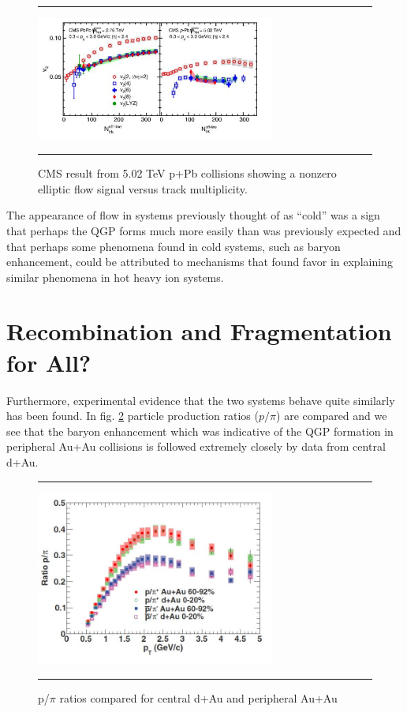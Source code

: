 \begin{figure}[htbp!]
  \centering    \rule{35em}{0.5pt}
    \includegraphics[width=0.7\textwidth]{prevplots/pPbflowLHC.JPG}

  \caption[Elliptic Flow in p+Pb at the LHC]{CMS result from 5.02 TeV p+Pb collisions showing a nonzero elliptic flow signal versus track multiplicity. \citep{Khachatryan:2015waa}}
  \label{fig:pPbflow}    \rule{35em}{0.5pt}
\end{figure} 

The appearance of flow in systems previously thought of as ``cold'' was a sign that perhaps the QGP forms much more easily than was previously expected and that perhaps some phenomena found in cold systems, such as baryon enhancement, could be attributed to mechanisms that found favor in explaining similar phenomena in hot heavy ion systems.

\section{Recombination and Fragmentation for All?}
\label{sect:recombcold}
Furthermore, experimental evidence that the two systems behave quite similarly has been found. In fig. \ref{fig:daaaratios} particle production ratios ($p/\pi$) are compared and we see that the baryon enhancement which was indicative of the QGP formation in peripheral Au+Au collisions is followed extremely closely by data from central d+Au. 

\begin{figure}[htbp!]
  \centering    \rule{35em}{0.5pt}
    \includegraphics[width=0.7\textwidth]{prevplots/dAvsAAratios.JPG}

  \caption[p/$\pi$ ratios compared for central d+Au and peripheral Au+Au]{p/$\pi$ ratios compared for central d+Au and peripheral Au+Au\citep{PhysRevC.88.024906}}
  \label{fig:daaaratios}    \rule{35em}{0.5pt}
\end{figure} 


